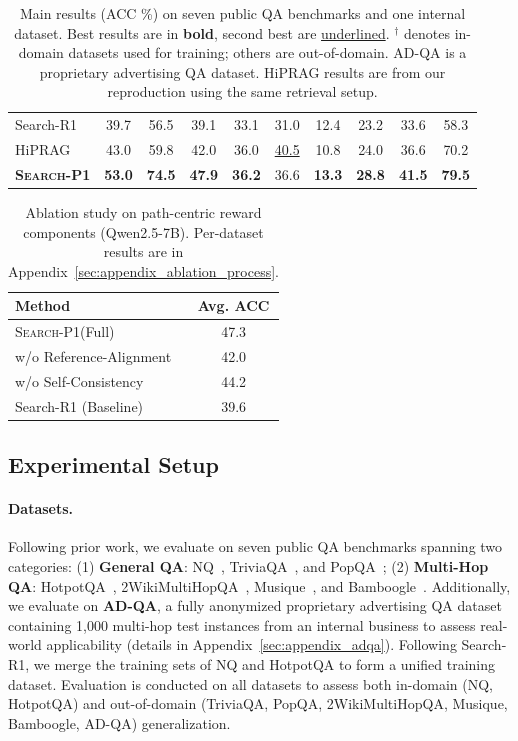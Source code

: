\documentclass[11pt]{article}
\newcommand{\method}{\textsc{Search-P1}\xspace}
\begin{document}
\begin{table}[t]
\begin{tabular}{l|ccc|cccc|c|c}
\midrule
Search-R1 & 39.7 & 56.5 & 39.1 & 33.1 & 31.0 & 12.4 & 23.2 & 33.6 & 58.3 \\
HiPRAG & 43.0 & 59.8 & 42.0 & 36.0 & \underline{40.5} & 10.8 & 24.0 & 36.6 & 70.2 \\
\textbf{\method} & \textbf{53.0} & \textbf{74.5} & \textbf{47.9} & \textbf{36.2} & 36.6 & \textbf{13.3} & \textbf{28.8} & \textbf{41.5} & \textbf{79.5} \\
\bottomrule
\end{tabular}
\caption{Main results (ACC \%) on seven public QA benchmarks and one internal dataset. Best results are in \textbf{bold}, second best are \underline{underlined}. $^\dagger$ denotes in-domain datasets used for training; others are out-of-domain. AD-QA is a proprietary advertising QA dataset. HiPRAG results are from our reproduction using the same retrieval setup.}
\label{tab:main}
\end{table}

\begin{table}[t]
\centering
\begin{tabular}{l|c}
\toprule
\textbf{Method} & \textbf{Avg. ACC} \\
\midrule
\method (Full) & 47.3 \\
\quad w/o Reference-Alignment & 42.0 \\
\quad w/o Self-Consistency & 44.2 \\
\midrule
Search-R1 (Baseline) & 39.6 \\
\bottomrule
\end{tabular}
\caption{Ablation study on path-centric reward components (Qwen2.5-7B). Per-dataset results are in Appendix~\ref{sec:appendix_ablation_process}.}
\label{tab:ablation}
\end{table}

\subsection{Experimental Setup}

\paragraph{Datasets.}
Following prior work, we evaluate on seven public QA benchmarks spanning two categories:
(1) \textbf{General QA}: NQ~\cite{kwiatkowski-etal-2019-natural}, TriviaQA~\cite{joshi-etal-2017-triviaqa}, and PopQA~\cite{mallen-etal-2023-trust};
(2) \textbf{Multi-Hop QA}: HotpotQA~\cite{yang-etal-2018-hotpotqa}, 2WikiMultiHopQA~\cite{ho-etal-2020-constructing}, Musique~\cite{trivedi-etal-2022-musique}, and Bamboogle~\cite{press-etal-2023-measuring}.
Additionally, we evaluate on \textbf{AD-QA}, a fully anonymized proprietary advertising QA dataset containing 1,000 multi-hop test instances from an internal business to assess real-world applicability (details in Appendix~\ref{sec:appendix_adqa}).
Following Search-R1, we merge the training sets of NQ and HotpotQA to form a unified training dataset.
Evaluation is conducted on all datasets to assess both in-domain (NQ, HotpotQA) and out-of-domain (TriviaQA, PopQA, 2WikiMultiHopQA, Musique, Bamboogle, AD-QA) generalization.
\end{document}

